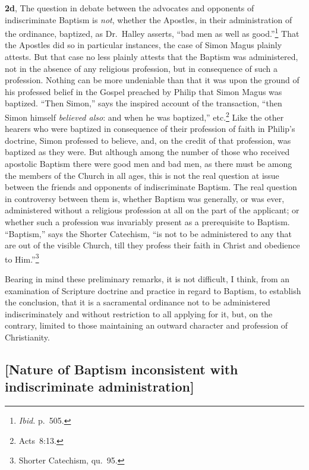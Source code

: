 \documentclass[
]{book}
\begin{document}
\textbf{2d}, The question in debate between the advocates and opponents of indiscriminate Baptism is \emph{not}, whether the Apostles, in their administration of the ordinance, baptized, as Dr.~Halley asserts, ``bad men as well as good.''\footnote{\emph{Ibid.} p.~505.} That the Apostles did so in particular instances, the case of Simon Magus plainly attests. But that case no less plainly attests that the Baptism was administered, not in the absence of any religious profession, but in consequence of such a profession. Nothing can be more undeniable than that it was upon the ground of his professed belief in the Gospel preached by Philip that Simon Magus was baptized. ``Then Simon,'' says the inspired account of the transaction, ``then Simon himself \emph{believed also}: and when he was baptized,'' etc.\footnote{Acts~8:13.} Like the other hearers who were baptized in consequence of their profession of faith in Philip's doctrine, Simon professed to believe, and, on the credit of that profession, was baptized as they were. But although among the number of those who received apostolic Baptism there were good men and bad men, as there must be among the members of the Church in all ages, this is not the real question at issue between the friends and opponents of indiscriminate Baptism. The real question in controversy between them is, whether Baptism was generally, or was ever, administered without a religious profession at all on the part of the applicant; or whether such a profession was invariably present as a prerequisite to Baptism. ``Baptism,'' says the Shorter Catechism, ``is not to be administered to any that are out of the visible Church, till they profess their faith in Christ and obedience to Him.''\footnote{Shorter Catechism, qu.~95.}

Bearing in mind these preliminary remarks, it is not difficult, I think, from an examination of Scripture doctrine and practice in regard to Baptism, to establish the conclusion, that it is a sacramental ordinance not to be administered indiscriminately and without restriction to all applying for it, but, on the contrary, limited to those maintaining an outward character and profession of Christianity.

\hypertarget{nature-of-baptism-inconsistent-with-indiscriminate-administration}{%
\subsection{{[}Nature of Baptism inconsistent with indiscriminate administration{]}}\label{nature-of-baptism-inconsistent-with-indiscriminate-administration}}
\end{document}
